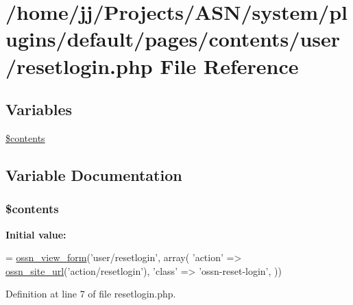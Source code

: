 \hypertarget{system_2plugins_2default_2pages_2contents_2user_2resetlogin_8php}{}\section{/home/jj/\+Projects/\+A\+S\+N/system/plugins/default/pages/contents/user/resetlogin.php File Reference}
\label{system_2plugins_2default_2pages_2contents_2user_2resetlogin_8php}
\subsection*{Variables}
\begin{DoxyCompactItemize}
\item 
\hyperlink{system_2plugins_2default_2pages_2contents_2user_2resetlogin_8php_a87e6516f43ab874500590fe9ec8315fb}{\$contents}
\end{DoxyCompactItemize}


\subsection{Variable Documentation}
\subsubsection[{\texorpdfstring{\$contents}{$contents}}]{\setlength{\rightskip}{0pt plus 5cm}\$contents}\hypertarget{system_2plugins_2default_2pages_2contents_2user_2resetlogin_8php_a87e6516f43ab874500590fe9ec8315fb}{}\label{system_2plugins_2default_2pages_2contents_2user_2resetlogin_8php_a87e6516f43ab874500590fe9ec8315fb}
{\bfseries Initial value\+:}
\begin{DoxyCode}
= \hyperlink{ossn_8lib_8views_8php_ac874e6342b6bbe7ac279180d7b4dcd2b}{ossn\_view\_form}(\textcolor{stringliteral}{'user/resetlogin'}, array(
                   \textcolor{stringliteral}{'action'} => \hyperlink{ossn_8lib_8system_8php_a2f12f9244f99eccd1225afb76ef2ab65}{ossn\_site\_url}(\textcolor{stringliteral}{'action/resetlogin'}),
                   \textcolor{stringliteral}{'class'} => \textcolor{stringliteral}{'ossn-reset-login'},
            ))
\end{DoxyCode}


Definition at line 7 of file resetlogin.\+php.

